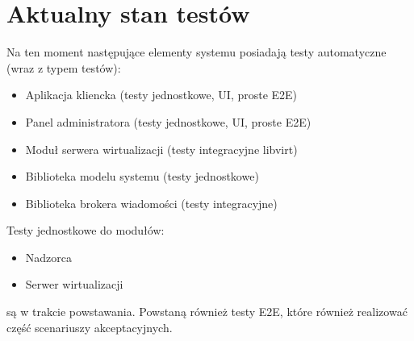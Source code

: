 \documentclass[12pt]{article}
\begin{document}
\section{Aktualny stan testów}
Na ten moment następujące elementy systemu posiadają testy automatyczne (wraz z typem testów):
\begin{itemize}
	\item Aplikacja kliencka (testy jednostkowe, UI, proste E2E)
	\item Panel administratora (testy jednostkowe, UI, proste E2E)
	\item Moduł serwera wirtualizacji (testy integracyjne libvirt)
	\item Biblioteka modelu systemu (testy jednostkowe)
	\item Biblioteka brokera wiadomości (testy integracyjne)
\end{itemize}
Testy jednostkowe do modułów:
\begin{itemize}
	\item Nadzorca
	\item Serwer wirtualizacji
\end{itemize}
są w trakcie powstawania.
Powstaną również testy E2E, które również realizować część scenariuszy akceptacyjnych.
\end{document}
